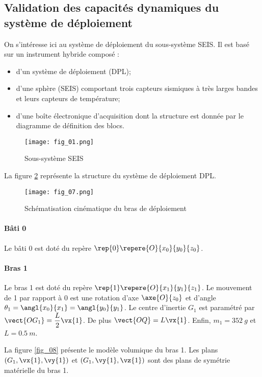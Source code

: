 
\subsection*{Validation des capacités dynamiques du système de déploiement}


On s'intéresse ici au système de déploiement du sous-système SEIS. Il est basé sur un instrument hybride composé :
\begin{itemize}
\item d'un système de déploiement (DPL);
\item d'une sphère (SEIS) comportant trois capteurs sismiques à très larges bandes et leurs capteurs de
température;
\item d'une boîte électronique d'acquisition dont la structure est donnée par le diagramme de
définition des blocs. 
\end{itemize}

\begin{figure}[!h]
\centering
\texttt{[image: fig\_01.png]}
\caption{Sous-système SEIS \label{fig_01}}
\end{figure}


La figure \ref{fig_07} représente la structure du système de déploiement DPL.

\begin{figure}[!h]
\centering
\texttt{[image: fig\_07.png]}
\caption{Schématisation cinématique du bras de déploiement \label{fig_07}}
\end{figure}




\paragraph*{Bâti 0}
Le bâti 0 est doté du repère $\rep{0} \repere{O}{x_0}{y_0}{z_0}$.

\paragraph*{Bras 1}

Le bras 1 est doté du repère $\rep{1} \repere{O}{x_1}{y_1}{z_1}$. Le mouvement de 1 par rapport à 0 est une rotation d'axe $\axe{O}{z_0}$  et d'angle $\theta_1 = \angl{x_0}{x_1}= \angl{y_0}{y_1}$. Le centre d'inertie $G_1$ est paramétré par $\vect{OG_1} = \dfrac{L}{2} \vx{1}$. De plus $\vect{OQ} = L\vx{1}$. Enfin, $m_1 = \SI{352}{g}$ et $L=\SI{0,5}{m}$.

La figure \ref{fig_08} présente le modèle volumique du bras 1. Les plans $\left(G_1,\vx{1},\vy{1}\right)$  et $\left(G_1,\vy{1},\vz{1}\right)$ sont des plans de symétrie matérielle du bras 1.

